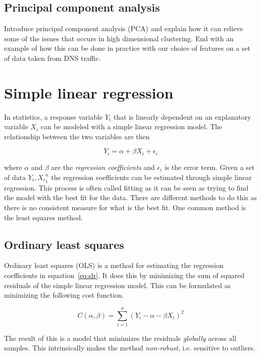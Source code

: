 \documentclass[a4paper]{report}
\begin{document}
\subsection{Principal component analysis}
Introduce principal component analysis (PCA) and explain how it can relieve
some of the issues that occurs in high dimensional clustering. End with an
example of how this can be done in practice with our choice of features on a
set of data taken from DNS traffic.

\section{Simple linear regression}
In statistics, a response variable $Y_i$ that is linearly dependent on an
explanatory variable $X_i$ can be modeled with a simple linear regression
model. The relationship between the two variables are then

\begin{equation}
    Y_i = \alpha + \beta X_i + \epsilon_i
    \label{eq:slr}
\end{equation}

where $\alpha$ and $\beta$ are the \emph{regression coefficients} and
$\epsilon_i$ is the error term. Given a set of data ${Y_i, X_i}_1^n$ the
regression coefficients can be estimated through simple linear regression. This
process is often called fitting as it can be seen as trying to find the model
with the best fit for the data. There are different methods to do this as there
is no consistent measure for what is the best fit. One common method is the
least squares method.

\subsection{Ordinary least squares}
Ordinary least squares (OLS) is a method for estimating the regression
coefficients in equation~\ref{eq:slr}. It does this by minimizing the sum of
squared residuals of the simple linear regression model. This can be formulated
as minimizing the following cost function.

\begin{equation}
    C(\alpha, \beta) = \sum_{i=1}^n(Y_i - \alpha - \beta X_i)^2
\end{equation}

The result of this is a model that minimizes the residuals \emph{globally}
across all samples. This intrinsically makes the method \emph{non-robust}, i.e.
sensitive to outliers.
\end{document}
